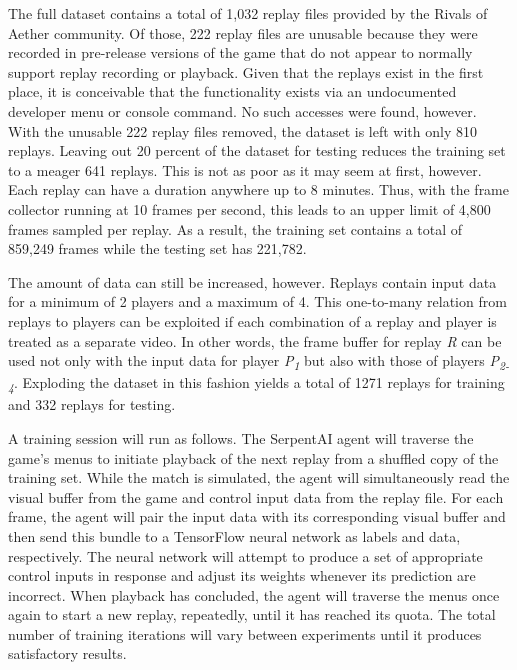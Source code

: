 The full dataset contains a total of 1,032 replay files provided by the Rivals of Aether community. Of those, 222 replay files are unusable because they were recorded in pre-release versions of the game that do not appear to normally support replay recording or playback. Given that the replays exist in the first place, it is conceivable that the functionality exists via an undocumented developer menu or console command. No such accesses were found, however. With the unusable 222 replay files removed, the dataset is left with only 810 replays. Leaving out 20 percent of the dataset for testing reduces the training set to a meager 641 replays. This is not as poor as it may seem at first, however. Each replay can have a duration anywhere up to 8 minutes. Thus, with the frame collector running at 10 frames per second, this leads to an upper limit of 4,800 frames sampled per replay. As a result, the training set contains a total of 859,249 frames while the testing set has 221,782.

The amount of data can still be increased, however. Replays contain input data for a minimum of 2 players and a maximum of 4. This one-to-many relation from replays to players can be exploited if each combination of a replay and player is treated as a separate video. In other words, the frame buffer for replay \textit{R} can be used not only with the input data for player \textit{\textit{P\textsubscript{1}}} but also with those of players \textit{P\textsubscript{2-4}}. Exploding the dataset in this fashion yields a total of 1271 replays for training and 332 replays for testing. 

A training session will run as follows. The SerpentAI agent will traverse the game's menus to initiate playback of the next replay from a shuffled copy of the training set. While the match is simulated, the agent will simultaneously read the visual buffer from the game and control input data from the replay file. For each frame, the agent will pair the input data with its corresponding visual buffer and then send this bundle to a TensorFlow neural network as labels and data, respectively. The neural network will attempt to produce a set of appropriate control inputs in response and adjust its weights  whenever its prediction are incorrect. When playback has concluded, the agent will traverse the menus once again to start a new replay, repeatedly, until it has reached its quota. The total number of training iterations will vary between experiments until it produces satisfactory results.

